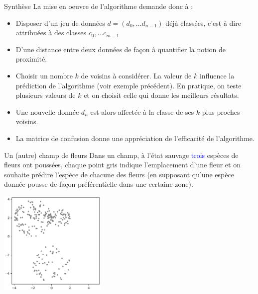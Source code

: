 \documentclass[10pt]{beamer}
\begin{document}
\begin{frame}{\Ctitle}{\stitle}
    \begin{block}{Synthèse}
        La mise en oeuvre de l'algorithme demande donc à :
        \begin{itemize}
            \item<1-> Disposer d'un jeu de données $d=(d_0, \dots d_{n-1})$ déjà classées, c'est à dire attribuées à des classes $c_0, \dots c_{m-1}$
            \item<2-> D'une distance entre deux données de façon à quantifier la notion de proximité.
            \item<3-> Choisir un nombre $k$ de voisins à considérer. La valeur de $k$ influence la prédiction de l'algorithme (voir exemple précédent). En pratique, on teste plusieurs valeurs de $k$ et on choisit celle qui donne les meilleurs résultats.
            \item<4-> Une nouvelle donnée $d_n$ est alors affectée à la classe de ses $k$ plus proches voisins.
            \item<5-> La matrice de confusion donne une appréciation de l'efficacité de l'algorithme.
        \end{itemize}
    \end{block}
\end{frame}



\begin{frame}{\Ctitle}{\stitle}
    \begin{exampleblock}{Un (autre) champ de fleurs}
        Dans un champ, à l'état sauvage \textcolor{blue}{trois} espèces de fleurs ont poussées, chaque point gris indique l'emplacement d'une fleur et on souhaite prédire l'espèce de chacune des fleurs (en supposant qu'une espèce donnée pousse de façon préférentielle dans une certaine zone).
        \begin{center}
            \includegraphics[height=5cm]{start_kmeans.eps}
        \end{center}
    \end{exampleblock}
\end{frame}
\end{document}
